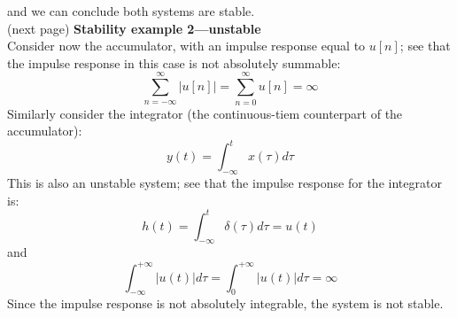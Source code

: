\documentclass{report}
\begin{document}
and we can conclude both systems are stable.\\
(next page)\newpage
\noindent\textbf{Stability example 2---unstable}\\
Consider now the accumulator, with an impulse response equal to $u[n]$; see that the impulse response in this case is not absolutely
summable:
\begin{equation*}
\sum^{\infty}_{n=-\infty}|u[n]|=\sum^{\infty}_{n=0}u[n]=\infty
\end{equation*}
Similarly consider the integrator (the continuous-tiem counterpart of the accumulator):
\begin{equation*}
y(t)=\int^t_{-\infty}x(\tau)d\tau
\end{equation*}
This is also an unstable system; see that the impulse response for the integrator is:
\begin{equation*}
h(t)=\int^t_{-\infty}\delta(\tau)d\tau=u(t)
\end{equation*}
and 
\begin{equation*}
\int^{+\infty}_{-\infty}|u(t)|d\tau=\int^{+\infty}_0|u(t)|d\tau=\infty
\end{equation*}
Since the impulse response is not absolutely integrable, the system is not stable.
\newpage
\end{document}
